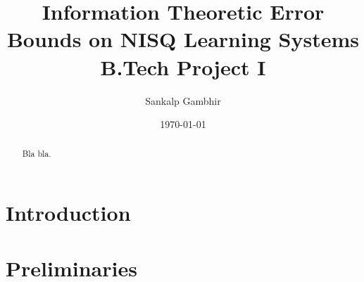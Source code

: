 \documentclass[
    paper=a4, 
    lang=en, 
    font=kpfonts, 
    hanging-titles,
    draft]
{skrapport}
\title{
    {Information Theoretic Error Bounds on NISQ Learning Systems} \\
    {\large B.Tech Project I}    
    }
\author[sgambhir@iitb.ac.in]{Sankalp Gambhir}
\date{\today}
\begin{document}
    \begin{titlepage}
        \maketitle
        \begin{abstract}
            Bla bla.
        \end{abstract}        
    \end{titlepage}

    \tableofcontents

    \section{Introduction}
        \label{sec:intro}
        
    
    \section{Preliminaries}
        \label{sec:prelim}
        

\end{document}
